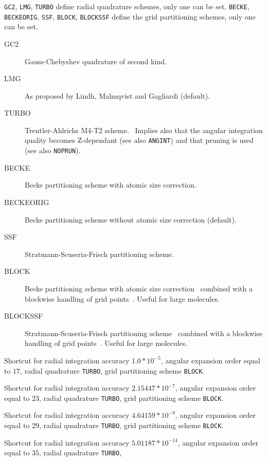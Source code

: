 \begin{description}
\verb|GC2|, \verb|LMG|, \verb|TURBO| define radial quadrature schemes, only one can be set.
\verb|BECKE|, \verb|BECKEORIG|, \verb|SSF|, \verb|BLOCK|, \verb|BLOCKSSF| define the grid partitioning schemes, only one can be set. 
\begin{description}
\item[GC2] Gauss-Chebyshev quadrature of second kind. 
\item[LMG] As proposed by Lindh, Malmqvist and Gagliardi (default).~\cite{dft-int:LMG}
\item[TURBO] Treutler-Ahlrichs M4-T2 scheme.~\cite{dft-int:treutler-ahlrichs} Implies also that the angular integration quality becomes Z-dependant (see also \verb|ANGINT|) and that pruning is used (see also \verb|NOPRUN|).
\item[BECKE] Becke partitioning scheme with atomic size correction.~\cite{dft-int:becke}
\item[BECKEORIG] Becke partitioning scheme without atomic size correction (default).~\cite{dft-int:becke}
\item[SSF] Stratmann-Scuseria-Frisch partitioning scheme.~\cite{dft-int:ssf}
\item[BLOCK] Becke partitioning scheme with atomic size correction~\cite{dft-int:becke}
combined with a blockwise handling of grid points~\cite{dft-int:dalton-blocked}. Useful for large molecules.
\item[BLOCKSSF] Stratmann-Scuseria-Frisch partitioning scheme~\cite{dft-int:ssf}
combined with a blockwise handling of grid points~\cite{dft-int:dalton-blocked}. Useful for large molecules.
\end{description}
\item[\Key{GRID1}]
Shortcut for radial integration accuracy $1.0*10^{-5}$, 
angular expansion order equal to $17$, 
radial quadrature \verb|TURBO|, 
grid partitioning scheme \verb|BLOCK|.
\item[\Key{GRID2}]
Shortcut for radial integration accuracy $2.15447*10^{-7}$, 
angular expansion order equal to $23$, 
radial quadrature \verb|TURBO|, 
grid partitioning scheme \verb|BLOCK|.
\item[\Key{GRID3}]
Shortcut for radial integration accuracy $4.64159*10^{-9}$, 
angular expansion order equal to $29$, 
radial quadrature \verb|TURBO|, 
grid partitioning scheme \verb|BLOCK|.
\item[\Key{GRID4}]
Shortcut for radial integration accuracy $5.01187*10^{-14}$,
angular expansion order equal to $35$,
radial quadrature \verb|TURBO|,

\end{description}
